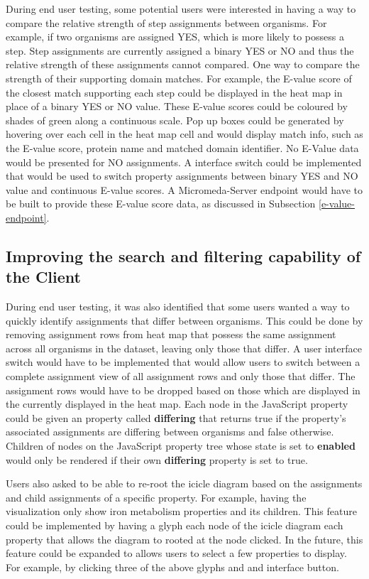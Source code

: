 During end user testing, some potential users were interested in having a way to compare the relative strength of step assignments between organisms. For example, if two organisms are assigned YES, which is more likely to possess a step. Step assignments are currently assigned a binary YES or NO and thus the relative strength of these assignments cannot compared. One way to compare the strength of their supporting domain matches. For example, the E-value score of the closest match supporting each step could be displayed in the heat map in place of a binary YES or NO value. These E-value scores could be coloured by shades of green along a continuous scale. Pop up boxes could be generated by hovering over each cell in the heat map cell and would display match info, such as the E-value score, protein name and matched domain identifier. No E-Value data would be presented for NO assignments. A interface switch could be implemented that would be used to switch property assignments between binary YES and NO value and continuous E-value scores. A Micromeda-Server endpoint would have to be built to provide these E-value score data, as discussed in Subsection \ref{e-value-endpoint}.

\subsection{Improving the search and filtering capability of the Client}

During end user testing, it was also identified that some users wanted a way to quickly identify assignments that differ between organisms. This could be done by removing assignment rows from heat map that possess the same assignment across all organisms in the dataset, leaving only those that differ. A user interface switch would have to be implemented that would allow users to switch between a complete assignment view of all assignment rows and only those that differ. The assignment rows would have to be dropped based on those which are displayed in the currently displayed in the heat map. Each node in the JavaScript property could be given an property called \textbf{differing} that returns true if the property's associated assignments are differing between organisms and false otherwise. Children of nodes on the JavaScript property tree whose state is set to \textbf{enabled} would only be rendered if their own \textbf{differing} property is set to true.

Users also asked to be able to re-root the icicle diagram based on the assignments and child assignments of a specific property. For example, having the visualization only show iron metabolism properties and its children. This feature could be implemented by having a glyph each node of the icicle diagram each property that allows the diagram to rooted at the node clicked. In the future, this feature could be expanded to allows users to select a few properties to display. For example, by clicking three of the above glyphs and and interface button.

